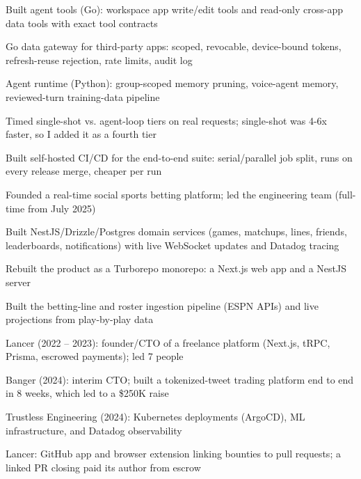 \documentclass[print]{jack-resume}
\begin{document}
\begin{tightemize}
    \item Built agent tools (Go): workspace app write/edit tools and read-only cross-app data tools with exact tool contracts
    \item Go data gateway for third-party apps: scoped, revocable, device-bound tokens, refresh-reuse rejection, rate limits, audit log
    \item Agent runtime (Python): group-scoped memory pruning, voice-agent memory, reviewed-turn training-data pipeline
    \item Timed single-shot vs. agent-loop tiers on real requests; single-shot was 4-6x faster, so I added it as a fourth tier
    \item Built self-hosted CI/CD for the end-to-end suite: serial/parallel job split, runs on every release merge, cheaper per run
\end{tightemize}
\sectionsep

\begin{tightemize}
    \item Founded a real-time social sports betting platform; led the engineering team (full-time from July 2025)
    \item Built NestJS/Drizzle/Postgres domain services (games, matchups, lines, friends, leaderboards, notifications) with live WebSocket updates and Datadog tracing
    \item Rebuilt the product as a Turborepo monorepo: a Next.js web app and a NestJS server
    \item Built the betting-line and roster ingestion pipeline (ESPN APIs) and live projections from play-by-play data
\end{tightemize}
\sectionsep

\begin{tightemize}
    \item Lancer (2022 -- 2023): founder/CTO of a freelance platform (Next.js, tRPC, Prisma, escrowed payments); led 7 people
    \item Banger (2024): interim CTO; built a tokenized-tweet trading platform end to end in 8 weeks, which led to a \$250K raise
    \item Trustless Engineering (2024): Kubernetes deployments (ArgoCD), ML infrastructure, and Datadog observability
    \item Lancer: GitHub app and browser extension linking bounties to pull requests; a linked PR closing paid its author from escrow
\end{tightemize}
\sectionsep
\end{document}
